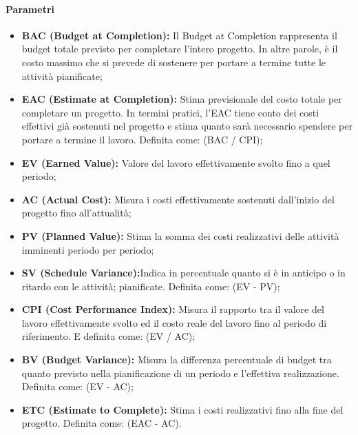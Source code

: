 \paragraph*{Parametri}
\begin{itemize}
    \item \textbf{BAC (Budget at Completion):}
    Il Budget at Completion rappresenta il budget totale previsto per completare l'intero progetto. In altre parole, è il costo massimo che si prevede di sostenere per portare a termine tutte le attività pianificate;
    \item \textbf{EAC (Estimate at Completion):}
    Stima previsionale del costo totale per completare un progetto. In termini pratici, l'EAC tiene conto dei costi effettivi già sostenuti nel progetto e stima quanto sarà necessario spendere per portare a termine il lavoro. Definita 
    come: (BAC / CPI);
    \item \textbf{EV (Earned Value):}
    Valore del lavoro effettivamente svolto fino a quel periodo;
    \item \textbf{AC (Actual Cost):} Misura i costi effettivamente sostenuti dall’inizio del progetto fino all’attualità;
    \item \textbf{PV (Planned Value):} Stima la somma dei costi realizzativi delle attività imminenti periodo per periodo;
    \item \textbf{SV (Schedule Variance):}Indica in percentuale quanto si è in anticipo o in ritardo con le attività;
    pianificate. Definita come: (EV - PV);
    \item \textbf{CPI (Cost Performance Index):} Misura il rapporto tra il valore del lavoro effettivamente svolto ed il 
    costo reale del lavoro fino al periodo di riferimento. E definita come: (EV / AC);
    \item \textbf{BV (Budget Variance):} Misura la differenza percentuale di budget tra quanto previsto nella
    pianificazione di un periodo e l’effettiva realizzazione. Definita come: (EV - AC);
    \item  \textbf{ETC (Estimate to Complete):} Stima i costi realizzativi fino alla fine del progetto. Definita come: 
    (EAC - AC).
    
\end{itemize} \hspace{1pt}



